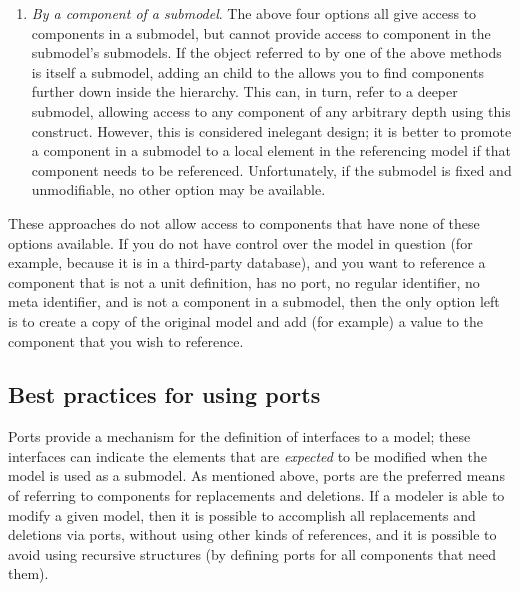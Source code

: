 \begin{enumerate}
\item \emph{By a component of a submodel}.  The above four options all
  give access to components in a submodel, but cannot provide access to
  component in the submodel's submodels.  If the object referred to by
  one of the above methods is itself a submodel, adding an \SBaseRef
  child to the \SBaseRef allows you to find components further down
  inside the hierarchy.  This can, in turn, refer to a deeper submodel,
  allowing access to any component of any arbitrary depth using this
  construct.  However, this is considered inelegant design; it is better
  to promote a component in a submodel to a local element in the
  referencing model if that component needs to be referenced.
  Unfortunately, if the submodel is fixed and unmodifiable, no other
  option may be available.

\end{enumerate}

These approaches do not allow access to components that have none of
these options available.  If you do not have control over the model in
question (for example, because it is in a third-party database), and you
want to reference a component that is not a unit definition, has no
port, no regular identifier, no meta identifier, and is not a component
in a submodel, then the only option left is to create a copy of the
original model and add (for example) a  value to the
component that you wish to reference.


\subsection{Best practices for using ports}
\label{best-practices-ports}



Ports provide a mechanism for the definition of interfaces to a model;
these interfaces can indicate the elements that are \emph{expected} to
be modified when the model is used as a submodel.  As mentioned above,
ports are the preferred means of referring to components for
replacements and deletions.  If a modeler is able to modify a given
model, then it is possible to accomplish all replacements and deletions
via ports, without using other kinds of references, and it is possible
to avoid using recursive \SBaseRef structures (by defining ports for all
components that need them).

